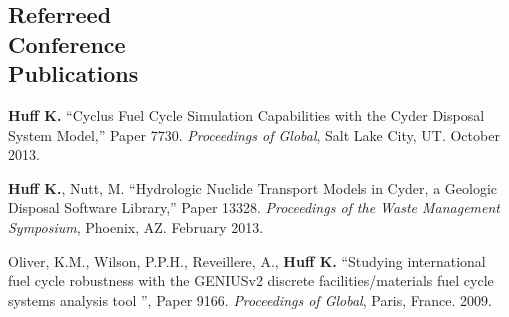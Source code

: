 \documentclass[margin,line]{resume}
\begin{document}
\begin{resume}
    \section{\mysidestyle Referreed\\Conference\\Publications}
    \begin{bibenum}
      \item \textbf{Huff K.} ``Cyclus Fuel Cycle Simulation Capabilities with the Cyder Disposal System Model,'' Paper 7730.
         \emph{Proceedings of Global}, Salt Lake City, UT. October 2013. 
      \item \textbf{Huff K.}, Nutt, M. ``Hydrologic Nuclide Transport Models in Cyder, a Geologic Disposal Software Library,'' Paper 13328.
         \emph{Proceedings of the Waste Management Symposium}, Phoenix, AZ.  February 2013. 
      \item Oliver, K.M., Wilson, P.P.H., Reveillere, A., \textbf{Huff K.} ``Studying international fuel cycle robustness with the GENIUSv2 discrete 
          facilities/materials fuel cycle systems analysis tool	'', Paper 9166. 
          \emph{Proceedings of Global}, Paris, France. 2009.
    \end{bibenum}

\end{resume}
\end{document}
